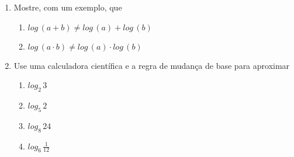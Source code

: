 \documentclass[a4paper, 11pt]{article}
\begin{document}
\begin{enumerate}
\item Mostre, com um exemplo, que
	\begin{enumerate}
\item $log \, (a + b) \neq log \, (a) + log \, (b)$
\item $log \, (a \cdot b) \neq log \, (a) · log \, (b)$
	\end{enumerate}


\item Use uma calculadora científica e a regra de mudança de base para aproximar
	\begin{enumerate}
\item $log_2 \, 3$ 
\item $log_5 \, 2$
\item $log_8 \, 24$ 
\item $log_6 \, \frac{1}{12}$
	\end{enumerate}





\end{enumerate}











						
\end{document}
